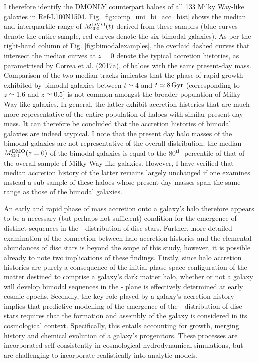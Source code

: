 I therefore identify the DMONLY counterpart haloes of all 133 Milky Way-like galaxies in Ref-L100N1504. Fig. \ref{fig:comp_uni_bi_acc_hist} shows the median and interquartile range of $M_{200}^{\rm DMO}(t)$ derived from these samples (blue curves denote the entire sample, red curves denote the six bimodal galaxies). As per the right-hand column of Fig. \ref{fig:bimodalexamples}, the overlaid dashed curves that intersect the median curves at $z=0$ denote the typical accretion histories, as parametrised by Correa et al. (2017a), of haloes with the same present-day mass. Comparison of the two median tracks indicates that the phase of rapid growth exhibited by bimodal galaxies between $t \simeq 4$ and $t \simeq 8\,{\rm Gyr}$ (corresponding to $z \simeq 1.6$ and $z \simeq 0.5$) is not common amongst the broader population of Milky Way-like galaxies. In general, the latter exhibit accretion histories that are much more representative of the entire population of haloes with similar present-day mass. It can therefore be concluded that the accretion histories of bimodal galaxies are indeed atypical. I note that the present day halo masses of the bimodal galaxies are not representative of the overall distribution; the median $M_{200}^{\rm DMO}(z=0)$ of the bimodal galaxies is equal to the $80^{\rm th}$ percentile of that of the overall sample of Milky Way-like galaxies. However, I have verified that median accretion history of the latter remains largely unchanged if one examines instead a sub-sample of these haloes whose present day masses span the same range as those of the bimodal galaxies.


An early and rapid phase of mass accretion onto a galaxy's halo therefore appears to be a necessary (but perhaps not sufficient) condition for the emergence of distinct sequences in the \afe{}-\feh{} distribution of disc stars. Further, more detailed examination of the connection between halo accretion histories and the elemental abundances of disc stars is beyond the scope of this study, however, it is possible already to note two implications of these findings. Firstly, since halo accretion histories are purely a consequence of the initial phase-space configuration of the matter destined to comprise a galaxy's dark matter halo, whether or not a galaxy will develop bimodal sequences in the \afe{}-\feh{} plane is effectively determined at early cosmic epochs. Secondly, the key role played by a galaxy's accretion history implies that predictive modelling of the emergence of the \afe{}-\feh{} distribution of disc stars requires that the formation and assembly of the galaxy is considered in its cosmological context. Specifically, this entails accounting for growth, merging history and chemical evolution of a galaxy's progenitors. These processes are incorporated self-consistently in cosmological hydrodynamical simulations, but are challenging to incorporate realistically into analytic models. 

